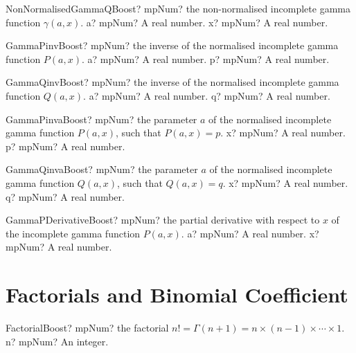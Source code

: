 \documentclass[12pt,a4paper,openany]{book}
\begin{document}
\begin{mpFunctionsExtract}
\mpFunctionTwo
{NonNormalisedGammaQBoost? mpNum? the non-normalised incomplete gamma function $\gamma(a,x)$.}
{a? mpNum? A real number.}
{x? mpNum? A real number.}
\end{mpFunctionsExtract}

\begin{mpFunctionsExtract}
\mpFunctionTwo
{GammaPinvBoost? mpNum? the inverse of the normalised incomplete gamma function $P(a,x)$.}
{a? mpNum? A real number.}
{p? mpNum? A real number.}
\end{mpFunctionsExtract}

\begin{mpFunctionsExtract}
\mpFunctionTwo
{GammaQinvBoost? mpNum? the inverse of the normalised incomplete gamma function $Q(a,x)$.}
{a? mpNum? A real number.}
{q? mpNum? A real number.}
\end{mpFunctionsExtract}

\begin{mpFunctionsExtract}
\mpFunctionTwo
{GammaPinvaBoost? mpNum? the parameter $a$ of the normalised incomplete gamma function $P(a,x)$, such that $P(a,x) = p$.}
{x? mpNum? A real number.}
{p? mpNum? A real number.}
\end{mpFunctionsExtract}

\begin{mpFunctionsExtract}
\mpFunctionTwo
{GammaQinvaBoost? mpNum? the parameter $a$ of the normalised incomplete gamma function $Q(a,x)$, such that $Q(a,x) = q$.}
{x? mpNum? A real number.}
{q? mpNum? A real number.}
\end{mpFunctionsExtract}

\begin{mpFunctionsExtract}
\mpFunctionTwo
{GammaPDerivativeBoost? mpNum? the partial derivative with respect to $x$ of the incomplete gamma function $P(a,x)$.}
{a? mpNum? A real number.}
{x? mpNum? A real number.}
\end{mpFunctionsExtract}

\section{Factorials and Binomial Coefficient}

\begin{mpFunctionsExtract}
\mpFunctionOne
{FactorialBoost? mpNum? the factorial $n! = \Gamma(n+1) = n \times (n-1) \times \cdots \times 1$.}
{n? mpNum? An integer.}
\end{mpFunctionsExtract}
\end{document}

